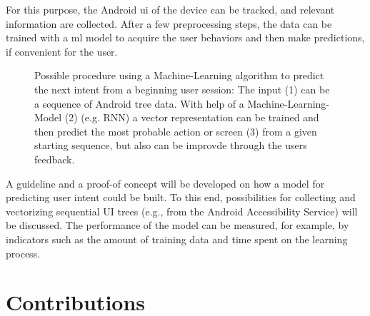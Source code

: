 For this purpose, the Android \gls{ui} of the device can be tracked, and relevant information are collected.
After a few preprocessing steps, the data can be trained with a \gls{ml} model to acquire the user behaviors and then make predictions, if convenient for the user.

\begin{figure}[htbp!]
    \centering
    
    \caption[Schema of ML-algorithm predicting user intent]{
        Possible procedure using a Machine-Learning algorithm to predict the next intent from a beginning user session:
        The input (1) can be a sequence of Android tree data.
        With help of a Machine-Learning-Model (2) (e.g. RNN) a vector representation can be trained and then predict the most probable action or screen (3) from a given starting sequence, but also can be improvde through the users feedback.
    }
    \label{fig:encode-decode}
\end{figure}

A guideline and a proof-of concept will be developed on how a model for predicting user intent could be built.
To this end, possibilities for collecting and vectorizing sequential UI trees (e.g., from the Android Accessibility Service) will be discussed.
The performance of the model can be measured, for example, by indicators such as the amount of training data and time spent on the learning process.

\section{Contributions}

%

